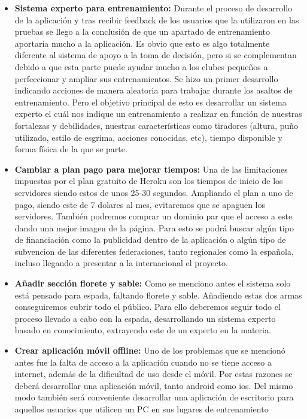 \begin{itemize}
  \item \textbf{Sistema experto para entrenamiento:} Durante el proceso de desarrollo de
    la aplicación y tras recibir feedback de los usuarios que la utilizaron en las pruebas
    se llego a la conclusión de que un apartado de entrenamiento aportaría mucho a la aplicación.
    Es obvio que esto es algo totalmente diferente al sistema de apoyo a la toma de decisión,
    pero si se complementan debido a que esta parte puede ayudar mucho a los clubes pequeños
    a perfeccionar y ampliar sus entrenamientos. Se hizo un primer desarrollo indicando
    acciones de manera aleatoria para trabajar durante los asaltos de entrenamiento. Pero el
    objetivo principal de esto es desarrollar un sistema experto el cuál nos indique un
    entrenamiento a realizar en función de nuestras fortalezas y debilidades, nuestras
    características como tiradores (altura, puño utilizado, estilo de esgrima,
    acciones conocidas, etc), tiempo disponible y forma física de la que se parte.
  \item \textbf{Cambiar a plan pago para mejorar tiempos:} Una de las limitaciones
    impuestas por el plan gratuito de Heroku son los tiempos de inicio de los servidores
    siendo estos de unos 25-30 segundos. Ampliando el plan a uno de pago, siendo este
    de 7 dolares al mes, evitaremos que se apaguen los servidores. También podremos
    comprar un dominio par que el acceso a este dando una mejor imagen de la página.
    Para esto se podrá buscar algún tipo de financiación como la publicidad dentro
    de la aplicación o algún tipo de subvencion de las diferentes federaciones, tanto
    regionales como la española, incluso llegando a presentar a la internacional el
    proyecto.
  \item \textbf{Añadir sección florete y sable:} Como se menciono antes el sistema
    solo está pensado para espada, faltando florete y sable. Añadiendo estas dos
    armas conseguiremos cubrir todo el público. Para ello deberemos seguir
    todo el proceso llevado a cabo con la espada, desarrollando un sistema experto
    basado en conocimiento, extrayendo este de un experto en la materia.
  \item \textbf{Crear aplicación móvil offline:} Uno de los problemas
    que se mencionó antes fue la falta de acceso a la aplicación cuando no se
    tiene acceso a internet, además de la dificultad de uso desde el móvil.
    Por estas razones se deberá desarrollar una aplicación móvil, tanto android
    como ios. Del mismo modo también será conveniente desarrollar una aplicación
    de escritorio para aquellos usuarios que utilicen un PC en sus lugares de entrenamiento
\end{itemize}
